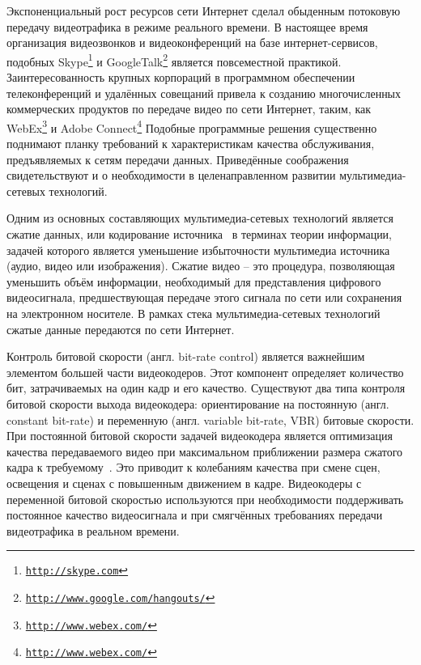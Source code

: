\label{sec:intro}

Экспоненциальный рост ресурсов сети Интернет
сделал обыденным
потоковую передачу видеотрафика в режиме реального времени.
В настоящее время организация видеозвонков и видеоконференций
на базе интернет-сервисов, подобных Skype\footnote{\texttt{\url{http://skype.com}}} и
GoogleTalk\footnote{\texttt{\url{http://www.google.com/hangouts/}}} является повсеместной практикой.
Заинтересованность крупных корпораций в программном
обеспечении телеконференций и удалённых совещаний
привела к созданию многочисленных коммерческих продуктов
по передаче видео по сети Интернет, таким, как
WebEx\footnote{\texttt{\url{http://www.webex.com/}}}
и Adobe Connect\footnote{\texttt{\url{http://www.webex.com/}}}
Подобные программные решения
существенно поднимают планку требований к характеристикам
качества обслуживания, предъявляемых к сетям передачи
данных. Приведённые соображения свидетельствуют и о
необходимости в целенаправленном развитии мультимедиа-сетевых
технологий.

Одним из основных составляющих мультимедиа-сетевых технологий
является сжатие данных, или кодирование источника~\cite{salomoncomp, sklarbook}
в терминах теории информации, задачей которого является
уменьшение избыточности мультимедиа источника (аудио,
видео или изображения). Сжатие видео -- это процедура,
позволяющая уменьшить объём информации, необходимый
для представления цифрового видеосигнала, предшествующая передаче
этого сигнала по сети или сохранения на электронном носителе.
В рамках стека мультимедиа-сетевых технологий сжатые данные
передаются по сети Интернет.

Контроль битовой скорости (англ. bit-rate control) является
важнейшим элементом большей части видеокодеров. Этот
компонент определяет количество бит, затрачиваемых на один
кадр и его качество. Существуют два типа контроля битовой
скорости выхода видеокодера: ориентирование на постоянную
(англ. constant bit-rate) и переменную (англ. variable bit-rate, VBR)
битовые скорости. При постоянной битовой скорости задачей
видеокодера является оптимизация качества передаваемого
видео при максимальном приближении размера сжатого кадра
к требуемому~\cite{survey2013}. Это приводит к колебаниям качества
при смене сцен, освещения и сценах с повышенным
движением в кадре. Видеокодеры с переменной битовой
скоростью используются при необходимости поддерживать постоянное
качество видеосигнала и при смягчённых требованиях
передачи видеотрафика в реальном времени.

